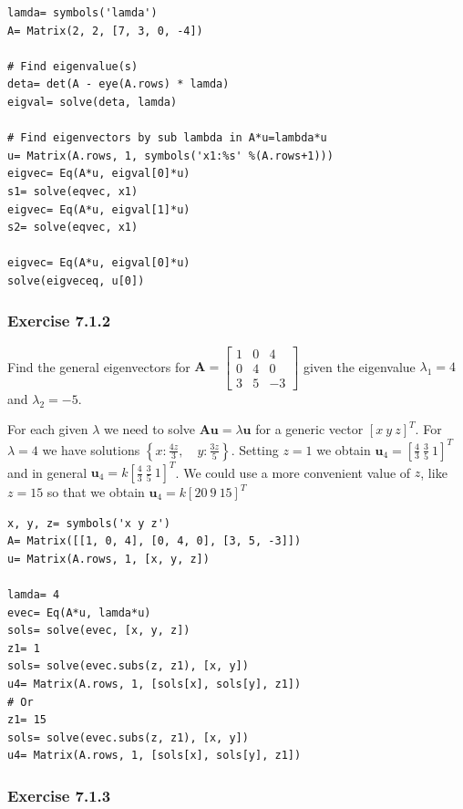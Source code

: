 \begin{verbatim}
lamda= symbols('lamda')
A= Matrix(2, 2, [7, 3, 0, -4])

# Find eigenvalue(s)
deta= det(A - eye(A.rows) * lamda)
eigval= solve(deta, lamda)

# Find eigenvectors by sub lambda in A*u=lambda*u
u= Matrix(A.rows, 1, symbols('x1:%s' %(A.rows+1)))
eigvec= Eq(A*u, eigval[0]*u)
s1= solve(eqvec, x1)
eigvec= Eq(A*u, eigval[1]*u)
s2= solve(eqvec, x1)

eigvec= Eq(A*u, eigval[0]*u)
solve(eigveceq, u[0])
\end{verbatim}

\subsubsection{Exercise 7.1.2}

Find the general eigenvectors for $\mathbf{A}= \left[\begin{matrix}1 & 0 & 4\\0 & 4 & 0\\3 & 5 & -3\end{matrix}\right]$
given the eigenvalue $\lambda_1= 4$ and $\lambda_2= -5$.

For each given $\lambda$ we need to solve $\mathbf{Au} = \lambda\mathbf{u}$ for
a generic vector $[x\ y\ z]^T$. For $\lambda= 4$ we have solutions $\left \{ x : \frac{4 z}{3}, \quad y : \frac{3 z}{5}\right \}$.
Setting $z= 1$ we obtain $\mathbf{u}_4 = [\frac{4}{3}\ \frac{3}{5}\ 1]^T$ and in general
$\mathbf{u}_4 = k[\frac{4}{3}\ \frac{3}{5}\ 1]^T$. We could use a more convenient
value of $z$, like $z= 15$ so that we obtain $\mathbf{u}_4 = k[20\ 9\ 15]^T$

\begin{verbatim}
x, y, z= symbols('x y z')
A= Matrix([[1, 0, 4], [0, 4, 0], [3, 5, -3]])
u= Matrix(A.rows, 1, [x, y, z])

lamda= 4
evec= Eq(A*u, lamda*u)
sols= solve(evec, [x, y, z])
z1= 1
sols= solve(evec.subs(z, z1), [x, y])
u4= Matrix(A.rows, 1, [sols[x], sols[y], z1])
# Or
z1= 15
sols= solve(evec.subs(z, z1), [x, y])
u4= Matrix(A.rows, 1, [sols[x], sols[y], z1])
\end{verbatim}

\subsubsection{Exercise 7.1.3}

